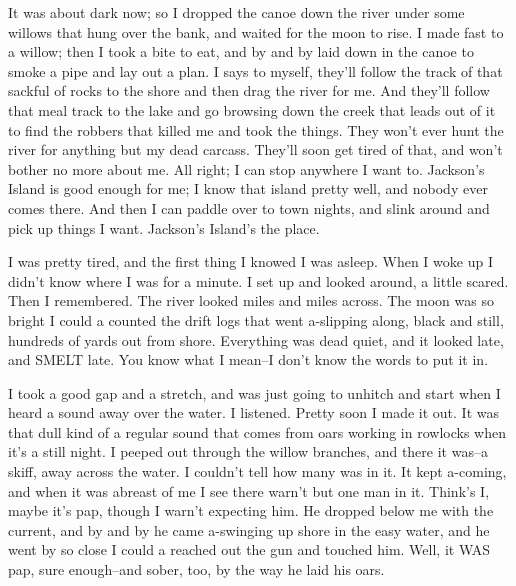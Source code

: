 It was about dark now; so I dropped the canoe down the river under some
willows that hung over the bank, and waited for the moon to rise.  I made
fast to a willow; then I took a bite to eat, and by and by laid down in
the canoe to smoke a pipe and lay out a plan.  I says to myself, they'll
follow the track of that sackful of rocks to the shore and then drag the
river for me.  And they'll follow that meal track to the lake and go
browsing down the creek that leads out of it to find the robbers that
killed me and took the things.  They won't ever hunt the river for
anything but my dead carcass. They'll soon get tired of that, and won't
bother no more about me.  All right; I can stop anywhere I want to.
Jackson's Island is good enough for me; I know that island pretty well,
and nobody ever comes there.  And then I can paddle over to town nights,
and slink around and pick up things I want. Jackson's Island's the place.

I was pretty tired, and the first thing I knowed I was asleep.  When I
woke up I didn't know where I was for a minute.  I set up and looked
around, a little scared.  Then I remembered.  The river looked miles and
miles across.  The moon was so bright I could a counted the drift logs
that went a-slipping along, black and still, hundreds of yards out from
shore. Everything was dead quiet, and it looked late, and SMELT late.
You know what I mean--I don't know the words to put it in.

I took a good gap and a stretch, and was just going to unhitch and start
when I heard a sound away over the water.  I listened.  Pretty soon I
made it out.  It was that dull kind of a regular sound that comes from
oars working in rowlocks when it's a still night.  I peeped out through
the willow branches, and there it was--a skiff, away across the water.  I
couldn't tell how many was in it.  It kept a-coming, and when it was
abreast of me I see there warn't but one man in it.  Think's I, maybe
it's pap, though I warn't expecting him.  He dropped below me with the
current, and by and by he came a-swinging up shore in the easy water, and
he went by so close I could a reached out the gun and touched him.  Well,
it WAS pap, sure enough--and sober, too, by the way he laid his oars.

